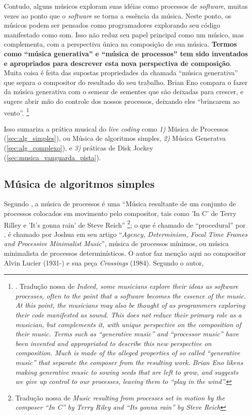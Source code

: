 \begin{citacao}
Contudo, alguns músicos exploram suas idéias como processos de \emph{software}, muitas vezes ao ponto que o \emph{software} se torna a essência da música. Neste ponto, os músicos podem ser pensados como programadores explorando seu código manifestado como som. Isso não reduz seu papel principal como um músico, mas complementa, com a perspectiva única na composição de sua música. \textbf{Termos como ``música generativa'' e ``música de processos'' tem sido inventados e apropriados para descrever esta nova perspectiva de composição}. Muita coisa é feita das supostas propriedades da chamada ``música generativa'' que separa o compositor do resultado do seu trabalho. Brian Eno compara o fazer da música generativa com o semear de sementes que são deixadas para crescer, e sugere abrir mão do controle dos nossos processos, deixando eles ``brincarem ao vento''. \footnote{. Tradução nossa de \emph{Indeed, some musicians explore their ideas as software processes, often to the point that a software becomes the essence of the music. At this point, the musicians may also be thought of as programmers exploring their code manifested as sound. This does not reduce their primary role as a musician, but complements it, with unique perspective on the composition of their music. Terms such as “generative music” and “processor music” have been invented and appropriated to describe this new perspective on composition. Much is made of the alleged properties of so called “generative music” that separate the composer from the resulting work. Brian Eno likens making generative music to sowing seeds that are left to grow, and suggests we give up control to our processes, leaving them to “play in the wind”.}}
\end{citacao}

Isso sumariza a prática musical do \emph{live coding} como \emph{1)} Música de Processos (\autoref{sec:alg_simples}), ou Música de algoritmos simples, \emph{2)} Música Generatva (\autoref{sec:alg_complexo}), e \emph{3)} práticas de Disk Jockey (\autoref{sec:musica_vanguarda_pista}).

\subsection{Música de algoritmos simples}\label{sec:alg_simples}

Segundo , a música de processos é uma ``Música resultante de um conjunto de processos colocados em movimento pelo compositor, tais como  'In C' de Terry Rilley e 'It's gonna rain' de Steve Reich'' \footnote{Tradução nossa de \emph{Music resulting from processes set in motion by the composer “In C” by Terry Riley and “Its gonna rain” by Steve Reich}}; o que é chamado de ``procedural'' por , é chamado por Joshua  em seu artigo ``\emph{Agency, Determinism, Focal Time Frames and Processive Minimalist Music}'', música de processos mínimos, ou música minimalista de processos determinísticos. O autor faz menção aqui ao compositor Alvin Lucier (1931-) e sua peça \emph{Crossings} (1984). Segundo o autor,

